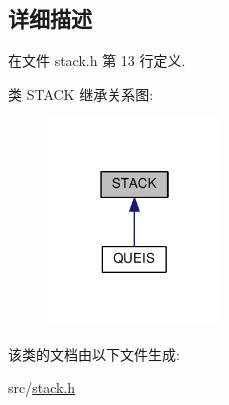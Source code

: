 \subsection{详细描述}


在文件 stack.\+h 第 13 行定义.



类 S\+T\+A\+CK 继承关系图\+:\nopagebreak
\begin{figure}[H]
\begin{center}
\leavevmode
\includegraphics[width=130pt]{classSTACK__inherit__graph}
\end{center}
\end{figure}


该类的文档由以下文件生成\+:\begin{DoxyCompactItemize}
\item 
src/\hyperlink{stack_8h}{stack.\+h}\end{DoxyCompactItemize}
